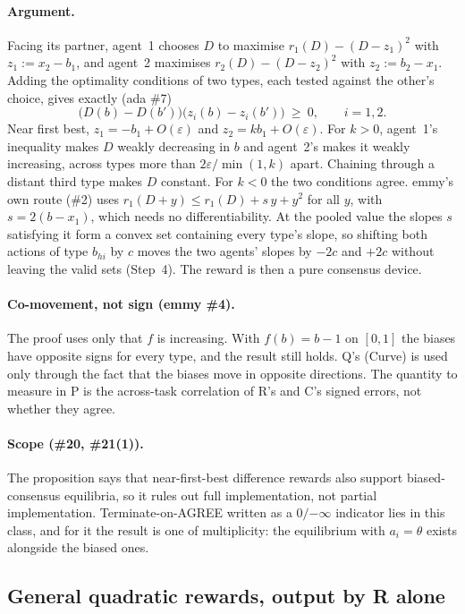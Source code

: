 \documentclass{article}
\begin{document}
\paragraph{Argument.} Facing its partner, agent~1 chooses $D$ to maximise
$r_1(D)-(D-z_1)^2$ with $z_1:=x_2-b_1$, and agent~2 maximises
$r_2(D)-(D-z_2)^2$ with $z_2:=b_2-x_1$. Adding the optimality conditions
of two types, each tested against the other's choice, gives exactly
(ada \#7)
\begin{equation*}
\bigl(D(b)-D(b')\bigr)\bigl(z_i(b)-z_i(b')\bigr)\ \ge\ 0,\qquad i=1,2.
\end{equation*}
Near first best, $z_1=-b_1+O(\varepsilon)$ and $z_2=kb_1+O(\varepsilon)$.
For $k>0$, agent~1's inequality makes $D$ weakly decreasing in $b$ and
agent~2's makes it weakly increasing, across types more than
$2\varepsilon/\min(1,k)$ apart. Chaining through a distant third type makes
$D$ constant. For $k<0$ the two conditions agree. emmy's own route (\#2)
uses $r_1(D+y)\le r_1(D)+s\,y+y^2$ for all $y$, with $s=2(b-x_1)$, which
needs no differentiability. At the pooled value the slopes $s$ satisfying
it form a convex set containing every type's slope, so shifting both
actions of type $b_{hi}$ by $c$ moves the two agents' slopes by $-2c$ and
$+2c$ without leaving the valid sets (Step~4). The reward is then a pure
consensus device.

\paragraph{Co-movement, not sign (emmy \#4).} The proof uses only that
$f$ is increasing. With $f(b)=b-1$ on $[0,1]$ the biases have opposite
signs for every type, and the result still holds. Q's (Curve) is used
only through the fact that the biases move in opposite directions. The
quantity to measure in P is the across-task correlation of R's and C's
signed errors, not whether they agree.

\paragraph{Scope (\#20, \#21(1)).} The proposition says that near-first-best
difference rewards also support biased-consensus equilibria, so it rules
out full implementation, not partial implementation. Terminate-on-AGREE
written as a $0/{-\infty}$ indicator lies in this class, and for it the
result is one of multiplicity: the equilibrium with $a_i=\theta$ exists
alongside the biased ones.

\subsection{General quadratic rewards, output by R alone}\label{sec:quad}
\end{document}
